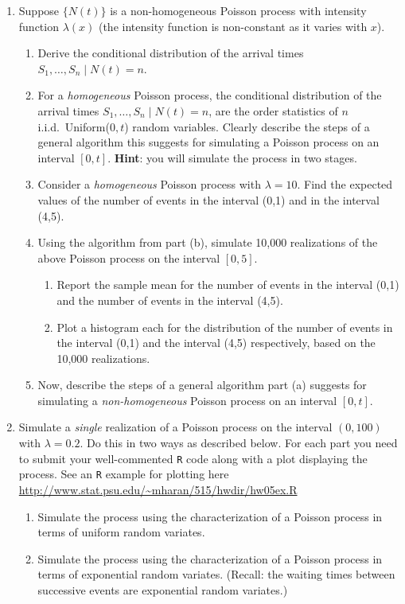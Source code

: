 \documentclass{article}
\begin{document}
\begin{enumerate}
\item Suppose $\{N(t)\}$ is a non-homogeneous Poisson process with
  intensity function $\lambda(x)$ (the intensity function is
  non-constant as it varies with $x$).
  \begin{enumerate}
  \item Derive the conditional distribution of the arrival times
    $S_1,\dots,S_n \mid N(t)=n$.
  \item For a {\it homogeneous} Poisson process, the conditional
    distribution of the arrival times $S_1,\dots,S_n \mid N(t)=n$, are
    the order statistics of $n$ i.i.d.\ Uniform($0,t$) random
    variables.  Clearly describe the steps of a general algorithm this suggests
    for simulating a Poisson process on an interval $[0,t]$. {\bf
      Hint}: you will simulate the process in two stages.
  \item Consider a {\it homogeneous} Poisson process with $\lambda=10$. Find the
    expected values of the number of events in the interval (0,1) and in
    the interval (4,5).
  \item Using the algorithm from part (b), simulate 10,000 realizations
    of the above Poisson process on the interval $[0,5]$.
    \begin{enumerate}
    \item Report the sample mean for the number of events in the interval (0,1) and the number of events in the interval (4,5). 
    \item Plot a histogram each for the distribution of the number of
      events in the interval (0,1) and the interval (4,5) respectively,
      based on the 10,000 realizations.
    \end{enumerate}
  \item Now, describe the steps of a general algorithm part (a) suggests for
    simulating a {\it non-homogeneous} Poisson process on an interval
    $[0,t]$.
  \end{enumerate}
\item Simulate a {\it single} realization of a Poisson process on the interval
  $(0,100)$ with $\lambda=0.2$. Do this in two ways as described
  below. For each part you need to submit your well-commented {\tt R}
  code along with a plot displaying the process. See an {\tt R}
  example for plotting here \url{http://www.stat.psu.edu/~mharan/515/hwdir/hw05ex.R} 
\begin{enumerate}
\item Simulate the process using the characterization of a Poisson process in terms of
  uniform random variates.
\item Simulate the process using the characterization of a Poisson process in terms of
  exponential random variates. (Recall: the waiting times between
  successive events are exponential random variates.)
  \end{enumerate}
  \end{enumerate}
\end{document}
